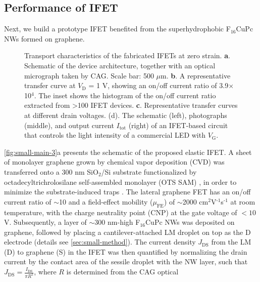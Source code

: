 \subsection{Performance of IFET }
\label{sec:small-field-effect-trans}

Next, we build a prototype IFET benefited from the superhydrophobic
F$_{16}$CuPc NWs formed on graphene.
%
\begin{figure}[!htbp]
  \centering
  \caption{\label{fig:small-main-3} Transport characteristics of the
    fabricated IFETs at zero strain. \textbf{a}. Schematic of the
    device architecture, together with an optical micrograph taken by
    CAG. Scale bar: 500 \(\mu\)m. \textbf{b}. A representative
    transfer curve at \(V_{\mathrm{D}}\) = 1 V, showing an on/off
    current ratio of 3.9\(\times{}\)10\(^{\text{4}}\). The inset shows
    the histogram of the on/off current ratio extracted from
    \textgreater{}100 IFET devices. \textbf{c}. Representative
    transfer curves at different drain voltages. (d). The schematic
    (left), photographs (middle), and output current
    \(I_{\mathrm{tot}}\) (right) of an IFET-based circuit that
    controls the light intensity of a commercial LED with
    \(V_{\mathrm{G}}\).}
\end{figure}
\autoref{fig:small-main-3}a presents the
schematic of the proposed elastic IFET.
%
A sheet of monolayer graphene grown by chemical vapor deposition (CVD)
was transferred onto a 300 nm SiO\(_{\text{2}}\)/Si substrate
functionalized by octadecyl\-trichrolosilane self-assembled monolayer
(OTS SAM) \autocite{Yan_2011}, in order to minimize the substrate-induced
traps \autocite{Wang_2011_quanti_doping_gr}.  The lateral graphene FET has
an on/off current ratio of \(\sim\)10 and a field-effect mobility
(\(\mu_{\mathrm{FE}}\)) of \(\sim\)2000
cm\(^{\text{2}}\)V\(^{\text{-1}}\)s\(^{\text{-1}}\) at room
temperature, with the charge neutrality point (CNP) at the gate
voltage of $<10$ V. Subsequently, a layer of \(\sim\)300 nm-high
F\(_{\text{16}}\)CuPc NWs was deposited on graphene, followed by
placing a cantilever-attached LM droplet on top as the D electrode
(details see \autoref{sec:small-method}).
%
The current density \(J_{\mathrm{DS}}\) from the LM (D) to graphene
(S) in the IFET was then quantified by normalizing the drain current
by the contact area of the sessile droplet with the NW layer, such
that
\(J_{\mathrm{DS}} = {\displaystyle \frac{I_{\mathrm{DS}}}{\pi
    R^{2}}}\), where \(R\) is determined from the CAG optical
